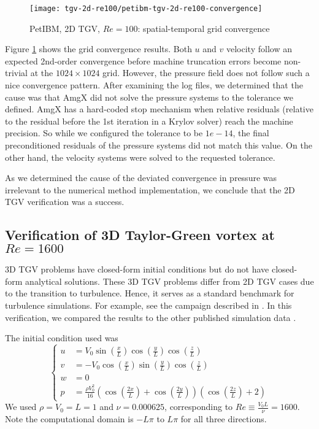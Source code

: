 \begin{figure}[H]
    \texttt{[image: tgv-2d-re100/petibm-tgv-2d-re100-convergence]}
    \caption{PetIBM, 2D TGV, $Re=100$: spatial-temporal grid convergence}
    \label{fig:petibm-tgv2d-re100-conv}
\end{figure}

Figure \ref{fig:petibm-tgv2d-re100-conv} shows the grid convergence results.
Both $u$ and $v$ velocity follow an expected 2nd-order convergence before machine truncation errors become non-trivial at the $1024 \times 1024$ grid.
However, the pressure field does not follow such a nice convergence pattern.
After examining the log files, we determined that the cause was that AmgX did not solve the pressure systems to the tolerance we defined.
AmgX has a hard-coded stop mechanism when relative residuals (relative to the residual before the 1st iteration in a Krylov solver) reach the machine precision.
So while we configured the tolerance to be $1e-14$, the final preconditioned residuals of the pressure systems did not match this value.
On the other hand, the velocity systems were solved to the requested tolerance.

As we determined the cause of the deviated convergence in pressure was irrelevant to the numerical method implementation, we conclude that the 2D TGV verification was a success.

\subsection*{Verification of 3D Taylor-Green vortex at $Re=1600$}

3D TGV problems have closed-form initial conditions but do not have closed-form analytical solutions.
These 3D TGV problems differ from 2D TGV cases due to the transition to turbulence.
Hence, it serves as a standard benchmark for turbulence simulations.
For example, see the campaign described in \cite{noauthor_1st_2012}. 
In this verification, we compared the results to the other published simulation data \cite{debonis_solutions_2013}.

The initial condition used was
\begin{equation}\label{eq:tgv3d-ic}
    \left\{
    \begin{aligned}
        u &=V_{0} \sin \left(\frac{x}{L}\right) \cos \left(\frac{y}{L}\right) \cos \left(\frac{z}{L}\right) \\
        v &=-V_{0} \cos \left(\frac{x}{L}\right) \sin \left(\frac{y}{L}\right) \cos \left(\frac{z}{L}\right) \\
        w &=0 \\
        p &=\frac{\rho V_{0}^{2}}{16}\left(\cos \left(\frac{2 x}{L}\right)+\cos \left(\frac{2 y}{L}\right)\right)\left(\cos \left(\frac{2 z}{L}\right)+2\right)
    \end{aligned}
    \right.
\end{equation}
We used $\rho = V_0 = L = 1$ and $\nu=0.000625$, corresponding to $Re \equiv \frac{V_0 L}{\nu} = 1600$.
Note the computational domain is $-L\pi$ to $L\pi$ for all three directions.


